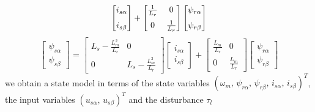 \documentclass[11pt,a4paper]{scrartcl}
\numberwithin{equation}{section}
\theoremstyle{it}
\theoremstyle{definition}
\begin{document}
\begin{onehalfspace}
\begin{equation}
	\left[\begin{matrix}
		i_{s\alpha} \\[6pt]
		i_{s\beta}
	\end{matrix}\right]+
	\left[\begin{matrix}
		\frac{1}{L_r} & 0 \\[6pt]
		0 & \frac{1}{L_r}
	\end{matrix}\right]
	\left[\begin{matrix}
		\psi_{r\alpha} \\[6pt]
		\psi_{r\beta}
	\end{matrix}\right]\\[6pt]
\end{equation}
\begin{equation}\label{eq51}
	\left[\begin{matrix}
		\psi_{s\alpha} \\[6pt]
		\psi_{s\beta}
	\end{matrix}\right] = 
	\left[\begin{matrix}
		L_s-\frac{L_m^2}{L_r} & 0 \\[6pt]
		0 & L_s-\frac{L_m^2}{L_r}
	\end{matrix}\right]
	\left[\begin{matrix}
		i_{s\alpha} \\[6pt]
		i_{s\beta}
	\end{matrix}\right]+
	\left[\begin{matrix}
		\frac{L_m}{L_r} & 0 \\[6pt]
		0 & \frac{L_m}{L_r}
	\end{matrix}\right]
	\left[\begin{matrix}
		\psi_{r\alpha} \\[6pt]
		\psi_{r\beta}
	\end{matrix}\right]
\end{equation}
we obtain a state model in terms of the state variables 
$\left(\omega_m,\,\psi_{r\alpha},\, 
\psi_{r\beta},\,i_{s\alpha},\,i_{s\beta}\right)^T$, the input variables 
$\left(u_{s\alpha},\, u_{s\beta}\right)^T$ and the disturbance $\tau_l$


\end{onehalfspace}
\end{document}
